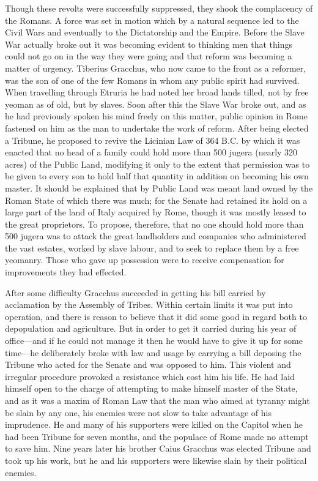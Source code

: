 \documentclass{book}
\begin{document}
Though these revolts were successfully suppressed, they shook the complacency of the Romans. A force was set in motion which by a natural sequence led to the Civil Wars and eventually to the Dictatorship and the Empire. Before the Slave War actually broke out it was becoming evident to thinking men that things could not go on in the way they were going and that reform was becoming a matter of urgency. Tiberius Gracchus, who now came to the front as a reformer, was the son of one of the few Romans in whom any public spirit had survived. When travelling through Etruria he had noted her broad lands tilled, not by free yeoman as of old, but by slaves. Soon after this the Slave War broke out, and as he had previously spoken his mind freely on this matter, public opinion in Rome fastened on him as the man to undertake the work of reform. After being elected a Tribune, he proposed to revive the Licinian Law of 364 B.C. by which it was enacted that no head of a family could hold more than 500 jugera (nearly 320 acres) of the Public Land, modifying it only to the extent that permission was to be given to every son to hold half that quantity in addition on becoming his own master. It should be explained that by Public Land was meant land owned by the Roman State of which there was much; for the Senate had retained its hold on a large part of the land of Italy acquired by Rome, though it was mostly leased to the great proprietors. To propose, therefore, that no one should hold more than 500 jugera was to attack the great landholders and companies who administered the vast estates, worked by slave labour, and to seek to replace them by a free yeomanry. Those who gave up possession were to receive compensation for improvements they had effected.

After some difficulty Gracchus succeeded in getting his bill carried by acclamation by the Assembly of Tribes. Within certain limits it was put into operation, and there is reason to believe that it did some good in regard both to depopulation and agriculture. But in order to get it carried during his year of office—and if he could not manage it then he would have to give it up for some time—he deliberately broke with law and usage by carrying a bill deposing the Tribune who acted for the Senate and was opposed to him. This violent and irregular procedure provoked a resistance which cost him his life. He had laid himself open to the charge of attempting to make himself master of the State, and as it was a maxim of Roman Law that the man who aimed at tyranny might be slain by any one, his enemies were not slow to take advantage of his imprudence. He and many of his supporters were killed on the Capitol when he had been Tribune for seven months, and the populace of Rome made no attempt to save him. Nine years later his brother Caius Gracchus was elected Tribune and took up his work, but he and his supporters were likewise slain by their political enemies.
\end{document}
